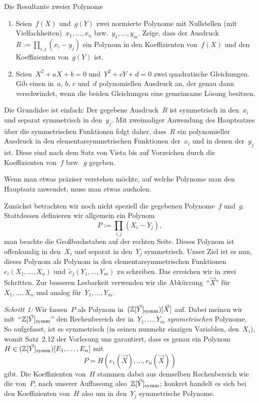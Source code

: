 \documentclass{algblatt}
\begin{document}
\begin{aufgabe}{Die Resultante zweier Polynome}
\begin{enumerate}
\item Seien~$f(X)$ und~$g(Y)$ zwei normierte Polynome mit Nullstellen (mit
Vielfachheiten)~$x_1,\ldots,x_n$ bzw.~$y_1,\ldots,y_m$. Zeige, dass der
Ausdruck~$R := \prod_{i,j} (x_i - y_j)$ ein Polynom in den
Koeffizienten von~$f(X)$ und den
Koeffizienten von~$g(Y)$ ist.
\item Seien~$X^2 + aX + b = 0$ und~$Y^2 + cY + d = 0$ zwei quadratische
Gleichungen. Gib einen in~$a$, $b$, $c$ und~$d$ polynomiellen Ausdruck an, der
genau dann verschwindet, wenn die beiden Gleichungen eine gemeinsame Lösung
besitzen.
\end{enumerate}

\begin{loesungE}
\item Die Grundidee ist einfach: Der gegebene Ausdruck~$R$ ist symmetrisch in
den~$x_i$ und separat symmetrisch in den~$y_j$. Mit zweimaliger Anwendung des
Hauptsatzes über die symmetrischen Funktionen folgt daher, dass~$R$ ein
polynomieller Ausdruck in den elementarsymmetrischen Funktionen der~$x_i$ und
in denen der~$y_j$ ist. Diese sind nach dem Satz von Vieta bis auf Vorzeichen
durch die Koeffizienten von~$f$ bzw.~$g$ gegeben.

Wenn man etwas präziser verstehen möchte, auf welche Polynome man den Hauptsatz
anwendet, muss man etwas ausholen.

Zunächst betrachten wir noch nicht speziell die gegebenen
Polynome~$f$ und~$g$. Stattdessen definieren wir allgemein ein Polynom
\[ P := \prod_{i,j} (X_i - Y_j), \]
man beachte die Großbuchstaben auf der rechten Seite. Dieses Polynom ist
offenkundig in den~$X_i$ und separat in den~$Y_j$ symmetrisch. Unser Ziel ist
es nun, dieses Polynom als Polynom in den elementarsymmetrischen
Funktionen~$e_i(X_1,\ldots,X_n)$ und~$\widetilde e_j(Y_1,\ldots,Y_m)$ zu schreiben. Das
erreichen wir in zwei Schritten. Zur besseren Lesbarkeit verwenden wir die
Abkürzung~"`$\vec X$"' für~$X_1,\ldots,X_n$ und analog für~$Y_1,\ldots,Y_m$.

\newcommand{\symm}{\mathrm{symm}}%
\emph{Schritt 1:} Wir fassen~$P$ als Polynom
in~$(\ZZ[\vec Y]_\symm)[\vec X]$ auf. Dabei meinen wir mit~"`$\ZZ[\vec
Y]_\symm$"' den Rechenbereich der in~$Y_1,\ldots,Y_m$ \emph{symmetrischen}
Polynome. So aufgefasst, ist es symmetrisch (in seinen nunmehr einzigen
Variablen, den~$X_i$), womit Satz~2.12 der
Vorlesung uns garantiert, dass es genau ein Polynom~$H \in (\ZZ[\vec
Y]_\symm)[E_1,\ldots,E_n]$ mit
\[ P = H(e_1(\vec X), \ldots, e_n(\vec X)) \]
gibt. Die Koeffizienten von~$H$ stammen dabei aus demselben Rechenbereich wie
die von~$P$, nach unserer Auffassung also~$\ZZ[\vec Y]_\symm$; konkret handelt
es sich bei den Koeffizienten von~$H$ also um in den~$Y_j$ symmetrische
Polynome.


\end{loesungE}
\end{aufgabe}
\end{document}
